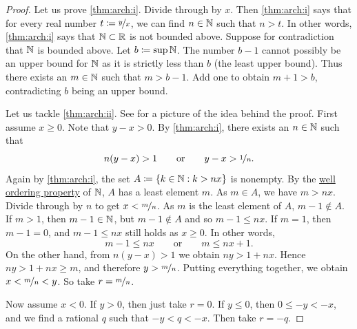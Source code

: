 \begin{proof}
Let us prove \ref{thm:arch:i}.  Divide through by $x$.
Then \ref{thm:arch:i} says that for every real number $t\coloneqq \nicefrac{y}{x}$,
we can find $n \in {\mathbb{N}}$ such that $n > t$.  In other words,
\ref{thm:arch:i} says that ${\mathbb{N}} \subset {\mathbb{R}}$ is not bounded above.
Suppose for contradiction that ${\mathbb{N}}$ is bounded above.  Let $b \coloneqq \sup {\mathbb{N}}$.
The number $b-1$ cannot possibly be an upper bound for ${\mathbb{N}}$ as it is strictly
less than $b$ (the least upper bound).  Thus there exists an $m \in {\mathbb{N}}$ such that $m > b-1$.
Add one to obtain $m+1 > b$, contradicting $b$ being an
upper bound.

\begin{myfigureht}
\caption{Idea of the proof of the density of $\Q$: Find $n$ such that $y-x >
\nicefrac{1}{n}$, then take the least $m$ such that $\nicefrac{m}{n} > x$.\label{figdensofQ}}
\end{myfigureht}
Let us tackle \ref{thm:arch:ii}.
See 
for a picture of the idea behind the proof.
First assume $x \geq 0$.
Note that $y-x > 0$.
By \ref{thm:arch:i}, there exists an $n \in {\mathbb{N}}$ such that
\begin{equation*}
n(y-x) > 1
\qquad \text{or} \qquad
y-x > \nicefrac{1}{n}.
\end{equation*}
Again by \ref{thm:arch:i}, the set
$A \coloneqq \{ k \in {\mathbb{N}} : k > nx \}$ is nonempty.  By the
\hyperlink{wop:link}{well ordering property}
of ${\mathbb{N}}$, $A$ has a least element $m$.
As $m \in A$, we have $m > nx$.
Divide through by $n$ to get $x < \nicefrac{m}{n}$.
As $m$ is the least
element of $A$, $m-1 \notin A$.
If $m > 1$, then $m-1 \in {\mathbb{N}}$, but $m-1 \notin A$ and so $m-1 \leq nx$.
If $m=1$,
then $m-1 = 0$, and $m-1 \leq nx$ still holds as $x \geq 0$.
In other words,
\begin{equation*}
m-1 \leq nx \qquad \text{or} \qquad m \leq nx+1 .
\end{equation*}
On the other hand,
from $n(y-x) > 1$ we obtain $ny > 1+nx$.
Hence $ny > 1+nx \geq m$, and therefore $y > \nicefrac{m}{n}$.
Putting everything together, we obtain $x < \nicefrac{m}{n} < y$.
So take $r = \nicefrac{m}{n}$.

Now assume $x < 0$.  If $y > 0$, then just take $r=0$.  If
$y \leq 0$, then $0 \leq -y < -x$, and we
find a rational $q$ such that $-y < q < -x$.  Then take $r = -q$.
\end{proof}

